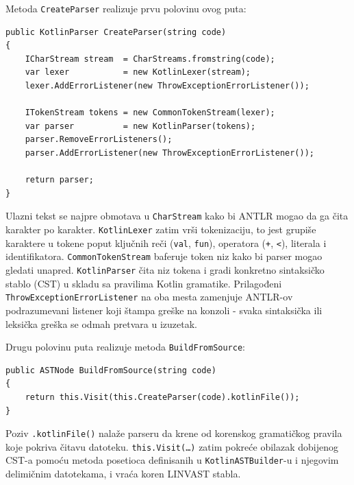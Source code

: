 \documentclass[a4paper]{article}
\begin{document}
\vspace{5px}
Metoda \texttt{CreateParser} realizuje prvu polovinu ovog puta:

\begin{lstlisting}[language=CSharp, caption={Kreiranje parsera iz izvornog koda}]
public KotlinParser CreateParser(string code)
{
    ICharStream stream  = CharStreams.fromstring(code);
    var lexer           = new KotlinLexer(stream);
    lexer.AddErrorListener(new ThrowExceptionErrorListener());

    ITokenStream tokens = new CommonTokenStream(lexer);
    var parser          = new KotlinParser(tokens);
    parser.RemoveErrorListeners();
    parser.AddErrorListener(new ThrowExceptionErrorListener());

    return parser;
}
\end{lstlisting}

\vspace{5px}
\noindent
Ulazni tekst se najpre obmotava u \texttt{CharStream} kako bi ANTLR mogao da
ga čita karakter po karakter. \texttt{KotlinLexer} zatim vrši tokenizaciju, to jest
grupiše karaktere u tokene poput ključnih reči (\texttt{val}, \texttt{fun}),
operatora (\texttt{+}, \texttt{<}), literala i identifikatora.
\texttt{CommonTokenStream} baferuje token niz kako bi parser mogao gledati
unapred. \texttt{KotlinParser} čita niz tokena i gradi konkretno sintaksičko
stablo (CST) u skladu sa pravilima Kotlin gramatike. Prilagođeni
\texttt{ThrowExceptionErrorListener} na oba mesta zamenjuje ANTLR-ov
podrazumevani listener koji štampa greške na konzoli - svaka sintaksička
ili leksička greška se odmah pretvara u izuzetak.

\vspace{5px}
Drugu polovinu puta realizuje metoda \texttt{BuildFromSource}:
\begin{lstlisting}[language=CSharp, caption={Izgradnja LINVAST stabla iz izvornog koda}]
public ASTNode BuildFromSource(string code)
{
    return this.Visit(this.CreateParser(code).kotlinFile());
}
\end{lstlisting}

\vspace{5px}
\noindent
Poziv \texttt{.kotlinFile()} nalaže parseru da krene od korenskog gramatičkog
pravila koje pokriva čitavu datoteku. \texttt{this.Visit(\ldots)} zatim
pokreće obilazak dobijenog CST-a pomoću metoda posetioca definisanih u
\texttt{KotlinASTBuilder}-u i njegovim delimičnim datotekama, i vraća koren
LINVAST stabla.

\newpage
\end{document}
